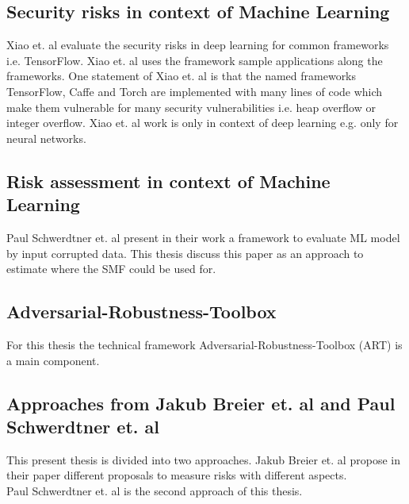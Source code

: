 \subsection{Security risks in context of Machine Learning}

Xiao et. al \cite{DBLP:conf/sp/XiaoLZX18} evaluate the security risks in deep learning for common frameworks i.e. TensorFlow. Xiao et. al uses the framework sample applications along the frameworks. One
statement of Xiao et. al is that the named frameworks TensorFlow, Caffe and Torch are implemented with many lines of code which make them vulnerable for many security vulnerabilities i.e. heap overflow
or integer overflow. Xiao et. al work is only in context of deep learning e.g. only for neural networks.

\subsection{Risk assessment in context of Machine Learning}

Paul Schwerdtner et. al \cite{DBLP:journals/corr/abs-2011-04328} present in their
work a framework to evaluate ML model by input corrupted data. This thesis discuss
this paper as an approach to estimate where the SMF could be used for.

\subsection{Adversarial-Robustness-Toolbox}

For this thesis the technical framework Adversarial-Robustness-Toolbox (ART)
\cite{art2018} is a main component.

\subsection{Approaches from Jakub Breier et. al and Paul Schwerdtner et. al}

This present thesis is divided into two approaches.
Jakub Breier et. al \cite{DBLP:journals/corr/abs-2012-04884} propose in their paper
different proposals to measure risks with different aspects. \\
Paul Schwerdtner et. al \cite{DBLP:journals/corr/abs-2011-04328} is the second approach of this thesis.
